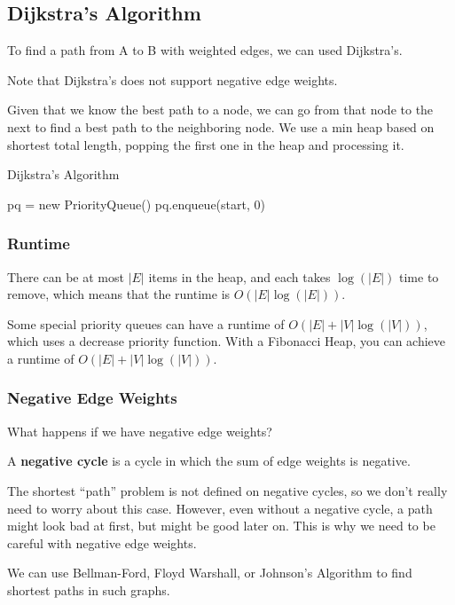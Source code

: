 
\subsection{Dijkstra's Algorithm}

To find a path from A to B with weighted edges, we can used Dijkstra's.

\begin{eg}
	Note that Dijkstra's does not support negative edge weights.
\end{eg}

Given that we know the best path to a node, we can go from that node to the next to find a best path to the neighboring node. We use a min heap based on shortest total length, popping the first one in the heap and processing it.

\begin{algorithm}
	\caption{Dijkstra's Algorithm}
	pq = new PriorityQueue()\;
	pq.enqueue(start, 0)\;
\end{algorithm}

\subsubsection{Runtime}

There can be at most \( |E| \) items in the heap, and each takes \( \log(|E|) \) time to remove, which means that the runtime is \( O(|E| \log(|E|)) \).

\begin{note}
	Some special priority queues can have a runtime of \( O(|E| + |V| \log(|V|)) \), which uses a decrease priority function. With a Fibonacci Heap, you can achieve a runtime of \( O(|E| + |V| \log(|V|)) \).
\end{note}

\subsubsection{Negative Edge Weights}

What happens if we have negative edge weights? 

\begin{definition}
	A \textbf{negative cycle} is a cycle in which the sum of edge weights is negative.
\end{definition}

The shortest ``path'' problem is not defined on negative cycles, so we don't really need to worry about this case. However, even without a negative cycle, a path might look bad at first, but might be good later on. This is why we need to be careful with negative edge weights.

\begin{note}
	We can use Bellman-Ford, Floyd Warshall, or Johnson's Algorithm to find shortest paths in such graphs.
\end{note}
